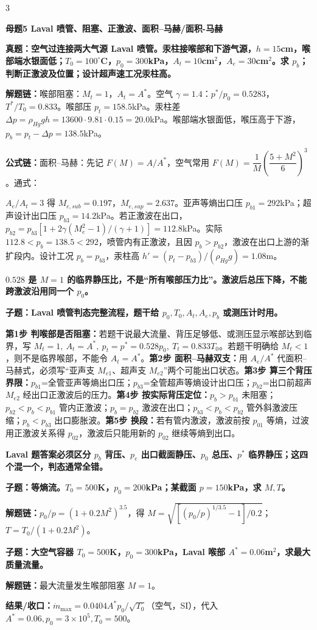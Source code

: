 \documentclass[a4paper]{article}
\newcommand{\mt}[1]{\vspace{0.45pt}\colorbox{M}{\parbox{\dimexpr\linewidth-2\fboxsep}{\color{white}\bfseries #1}}\par}
\newcommand{\qt}[1]{\vspace{0.25pt}\colorbox{Q}{\parbox{\dimexpr\linewidth-2\fboxsep}{\color{white}\bfseries #1}}\par}
\newcommand{\ans}[1]{\colorbox{G}{\parbox{\dimexpr\linewidth-2\fboxsep}{#1}}\par}
\newcommand{\warn}[1]{\colorbox{Y}{\parbox{\dimexpr\linewidth-2\fboxsep}{\color{E}\bfseries #1}}\par}
\newcommand{\chain}[1]{{\color{A}\bfseries 解题链：}#1\par}
\newcommand{\res}[1]{{\color{E}\bfseries 结果/收口：}#1\par}
\newcommand{\form}[1]{{\color{M}\bfseries 公式链：}#1\par}
\newenvironment{vfourWrap}{\par\begingroup\fontsize{2.68}{2.84}\selectfont\setlength{\fboxsep}{0.45pt}}{\par\endgroup}
\begin{document}
\begin{multicols}{3}
\begin{vfourWrap}
\end{vfourWrap}
\mt{母题5 Laval 喷管、阻塞、正激波、面积--马赫/面积-马赫}
\qt{真题：空气过连接两大气源 Laval 喷管。汞柱接喉部和下游气源，$h=15$cm，喉部端水银面低；$T_0=100^\circ$C，$p_0=300$kPa，$A_t=10$cm$^2$，$A_e=30$cm$^2$。求 $p_b$；判断正激波及位置；设计超声速工况汞柱高。}
\chain{喉部阻塞：$M_t=1$，$A_t=A^*$。空气 $\gamma=1.4$：$p^*/p_0=0.5283$，$T^*/T_0=0.833$。喉部压 $p_t=158.5$kPa。汞柱差 $\Delta p=\rho_{Hg}gh=13600\cdot9.81\cdot0.15=20.0$kPa。喉部端水银面低，喉压高于下游，$p_b=p_t-\Delta p=138.5$kPa。}
\form{面积--马赫：先记 $F(M)=A/A^*$，空气常用 $F(M)=\dfrac1M\left(\dfrac{5+M^2}{6}\right)^3$。通式：}
\ans{\resizebox{0.94\linewidth}{!}{$\displaystyle F(M)=\frac{A}{A^*}=\frac1M\left[\frac{2}{\gamma+1}\left(1+\frac{\gamma-1}{2}M^2\right)\right]^{\frac{\gamma+1}{2(\gamma-1)}}$}}
\ans{$A_e/A_t=3$ 得 $M_{e,sub}=0.197$，$M_{e,sup}=2.637$。亚声等熵出口压 $p_{b1}=292$kPa；超声设计出口压 $p_{b3}=14.2$kPa。若正激波在出口，$p_{b2}=p_{b3}[1+2\gamma(M_e^2-1)/(\gamma+1)]=112.8$kPa。实际 $112.8<p_b=138.5<292$，喷管内有正激波，且因 $p_b>p_{b2}$，激波在出口上游的渐扩段内。设计工况 $p_b=p_{b3}$，汞柱高 $h'=(p_t-p_{b3})/(\rho_{Hg}g)=1.08$m。}
\warn{$0.528$ 是 $M=1$ 的临界静压比，不是“所有喉部压力比”。激波后总压下降，不能跨激波沿用同一个 $p_0$。}

\qt{子题：Laval 喷管判态完整流程，题干给 $p_0,T_0,A_t,A_e,p_b$ 或测压计时用。}
\ans{\textbf{第1步 判喉部是否阻塞：}若题干说最大流量、背压足够低、或测压显示喉部达到临界，写 $M_t=1,\ A_t=A^*,\ p_t=p^*=0.528p_0,\ T_t=0.833T_0$。若题干明确给 $M_t<1$，则不是临界喉部，不能令 $A_t=A^*$。\textbf{第2步 面积--马赫双支：}用 $A_e/A^*$ 代面积--马赫式，必须写“亚声支 $M_{e1}$、超声支 $M_{e2}$”两个可能出口状态。\textbf{第3步 算三个背压界限：}$p_{b1}$=全管亚声等熵出口压；$p_{b3}$=全管超声等熵设计出口压；$p_{b2}$=出口前超声 $M_{e2}$ 经出口正激波后的压力。\textbf{第4步 按实际背压定位：}$p_b>p_{b1}$ 未阻塞；$p_{b2}<p_b<p_{b1}$ 管内正激波；$p_b=p_{b2}$ 激波在出口；$p_{b3}<p_b<p_{b2}$ 管外斜激波压缩；$p_b<p_{b3}$ 出口膨胀波。\textbf{第5步 换段：}若有管内激波，激波前按 $p_{01}$ 等熵，过波用正激波关系得 $p_{02}$，激波后只能用新的 $p_{02}$ 继续等熵到出口。}
\warn{Laval 题答案必须区分 $p_b$ 背压、$p_e$ 出口截面静压、$p_0$ 总压、$p^*$ 临界静压；这四个混一个，判态通常全错。}

\qt{子题：等熵流。$T_0=500$K，$p_0=200$kPa；某截面 $p=150$kPa，求 $M,T$。}
\chain{$p_0/p=(1+0.2M^2)^{3.5}$，得 $M=\sqrt{[(p_0/p)^{1/3.5}-1]/0.2}$；$T=T_0/(1+0.2M^2)$。}

\qt{子题：大空气容器 $T_0=500$K，$p_0=300$kPa，Laval 喉部 $A^*=0.06$m$^2$，求最大质量流量。}
\chain{最大流量发生喉部阻塞 $M=1$。}
\res{$\dot m_{\max}=0.0404 A^*p_0/\sqrt{T_0}$（空气，SI），代入 $A^*=0.06,p_0=3\times10^5,T_0=500$。}


\end{multicols}
\end{document}
